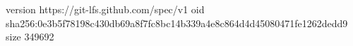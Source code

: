 version https://git-lfs.github.com/spec/v1
oid sha256:0e3b5f78198c430db69a8f7fc8bc14b339a4e8c864d4d45080471fe1262dedd9
size 349692
